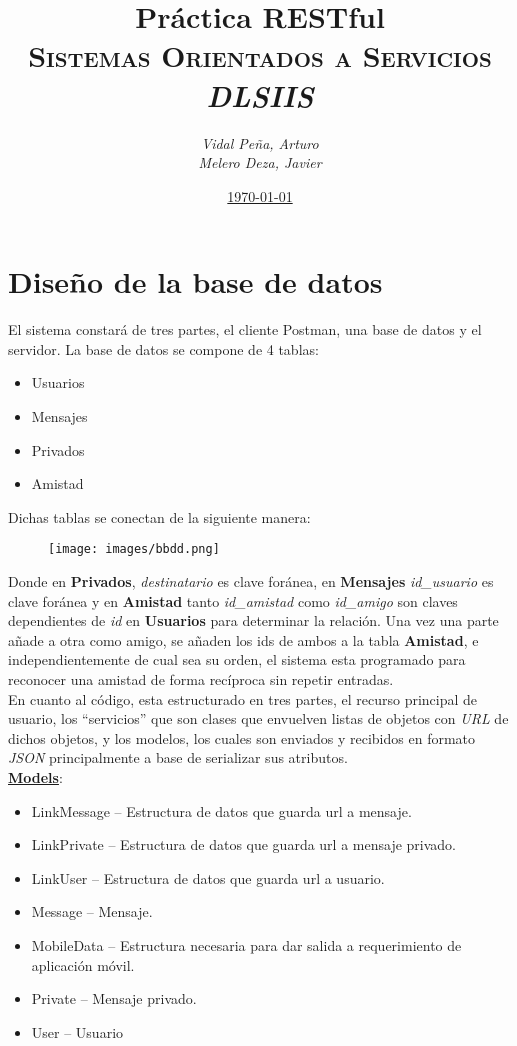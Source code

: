 \documentclass[12pt,a4paper, spanish]{article}
\title{\textbf{Práctica RESTful} \\
       \textsc{Sistemas Orientados a Servicios} \\
       \emph{DLSIIS}}
\author{\emph{Vidal Peña, Arturo}\\
        \emph{Melero Deza, Javier}}
\date{\underline{\today}}
\begin{document}
\maketitle
\thispagestyle{empty}
\renewcommand*\contentsname{Índice de contenidos}
\tableofcontents
\pagebreak


\section{Diseño de la base de datos}
El sistema constará de tres partes, el cliente Postman, una base de datos y el servidor. La base de datos se compone de 4 tablas: 
\begin{itemize}
	\item Usuarios
	\item Mensajes
	\item Privados
	\item Amistad
\end{itemize}

Dichas tablas se conectan de la siguiente manera:
\begin{figure}[H]
	\centering
	\texttt{[image: images/bbdd.png]}
\end{figure}
Donde en \textbf{Privados}, \textit{destinatario} es clave foránea, en \textbf{Mensajes} \textit{id\_usuario} es clave foránea y en \textbf{Amistad} tanto \textit{id\_amistad} como \textit{id\_amigo} son claves dependientes de \textit{id} en \textbf{Usuarios} para determinar la relación. Una vez una parte añade a otra como amigo, se añaden los ids de ambos a la tabla \textbf{Amistad}, e independientemente de cual sea su orden, el sistema esta programado para reconocer una amistad de forma recíproca sin repetir entradas.\\

En cuanto al código, esta estructurado en tres partes, el recurso principal de usuario, los “servicios” que son clases que envuelven listas de objetos con \textit{URL} de dichos objetos, y los modelos, los cuales son enviados y recibidos en formato \textit{JSON} principalmente a base de serializar sus atributos.\\

\textbf{\underline{Models}}:
\begin{itemize}
	\item LinkMessage – Estructura de datos que guarda url a mensaje.
	\item LinkPrivate – Estructura de datos que guarda url a mensaje privado.
	\item LinkUser – Estructura de datos que guarda url a usuario.
	\item Message – Mensaje.
	\item MobileData – Estructura necesaria para dar salida a requerimiento de aplicación móvil.
	\item Private – Mensaje privado.
	\item User – Usuario 
\end{itemize} 
\end{document}
